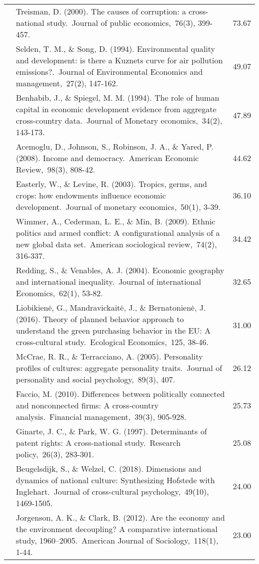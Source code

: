 \documentclass[
  man,floatsintext]{apa6}
\begin{document}
\begin{center}
\begin{ThreePartTable}
{\begin{longtable}{m{2cm}m{11cm}m{2cm}}
 & Treisman, D. (2000). The causes of corruption: a cross-national study. Journal of public economics, 76(3), 399-457. & 73.67\\
 & Selden, T. M., \& Song, D. (1994). Environmental quality and development: is there a Kuznets curve for air pollution emissions?. Journal of Environmental Economics and management, 27(2), 147-162. & 49.07\\
 & Benhabib, J., \& Spiegel, M. M. (1994). The role of human capital in economic development evidence from aggregate cross-country data. Journal of Monetary economics, 34(2), 143-173. & 47.89\\
 & Acemoglu, D., Johnson, S., Robinson, J. A., \& Yared, P. (2008). Income and democracy. American Economic Review, 98(3), 808-42. & 44.62\\
 & Easterly, W., \& Levine, R. (2003). Tropics, germs, and crops: how endowments influence economic development. Journal of monetary economics, 50(1), 3-39. & 36.10\\
 & Wimmer, A., Cederman, L. E., \& Min, B. (2009). Ethnic politics and armed conflict: A configurational analysis of a new global data set. American sociological review, 74(2), 316-337. & 34.42\\
 & Redding, S., \& Venables, A. J. (2004). Economic geography and international inequality. Journal of international Economics, 62(1), 53-82. & 32.65\\
 & Liobikienė, G., Mandravickaitė, J., \& Bernatonienė, J. (2016). Theory of planned behavior approach to understand the green purchasing behavior in the EU: A cross-cultural study. Ecological Economics, 125, 38-46. & 31.00\\
 & McCrae, R. R., \& Terracciano, A. (2005). Personality profiles of cultures: aggregate personality traits. Journal of personality and social psychology, 89(3), 407. & 26.12\\
 & Faccio, M. (2010). Differences between politically connected and nonconnected firms: A cross‐country analysis. Financial management, 39(3), 905-928. & 25.73\\
 & Ginarte, J. C., \& Park, W. G. (1997). Determinants of patent rights: A cross-national study. Research policy, 26(3), 283-301. & 25.08\\
 & Beugelsdijk, S., \& Welzel, C. (2018). Dimensions and dynamics of national culture: Synthesizing Hofstede with Inglehart. Journal of cross-cultural psychology, 49(10), 1469-1505. & 24.00\\
 & Jorgenson, A. K., \& Clark, B. (2012). Are the economy and the environment decoupling? A comparative international study, 1960–2005. American Journal of Sociology, 118(1), 1-44. & 23.00\\

\end{longtable}}
\end{ThreePartTable}
\end{center}
\end{document}
